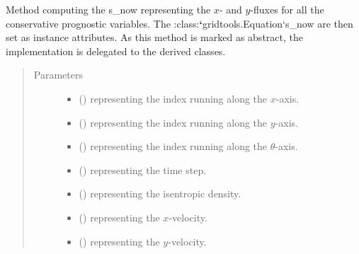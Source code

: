 \documentclass[letterpaper,10pt,english]{sphinxmanual}
\begin{document}
\begin{fulllineitems}
\begin{fulllineitems}
\label{\detokenize{api:dycore.flux_isentropic.FluxIsentropic._compute_horizontal_fluxes}}
Method computing the s\_now representing the \(x\)- and \(y\)-fluxes for all
the conservative prognostic variables. The :class:{\color{red}\bfseries{}{}`}gridtools.Equation{}`s\_now are then set as instance attributes.
As this method is marked as abstract, the implementation is delegated to the derived classes.
\begin{quote}\begin{description}
\item[{Parameters}] \leavevmode\begin{itemize}
\item {} 
 () \textendash{}  representing the index running along the \(x\)-axis.

\item {} 
 () \textendash{}  representing the index running along the \(y\)-axis.

\item {} 
 () \textendash{}  representing the index running along the \(\theta\)-axis.

\item {} 
 () \textendash{}  representing the time step.

\item {} 
 () \textendash{}  representing the isentropic density.

\item {} 
 () \textendash{}  representing the \(x\)-velocity.

\item {} 
 () \textendash{}  representing the \(y\)-velocity.


\end{itemize}
\end{description}
\end{quote}
\end{fulllineitems}
\end{fulllineitems}
\end{document}
